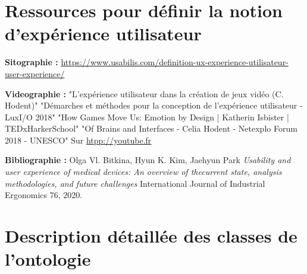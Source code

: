 \documentclass[11pt]{article}
\begin{document}
\newpage
\section{Ressources pour définir la notion d'expérience utilisateur}\label{ann:ux}
	\textbf{Sitographie :}\newline
	\href{https://www.usabilis.com/definition-ux-experience-utilisateur-user-experience/}{https://www.usabilis.com/definition-ux-experience-utilisateur-user-experience/}\par
	\textbf{Videographie :}\newline
	"L'expérience utilisateur dans la création de jeux vidéo (C. Hodent)"\newline
	"Démarches et méthodes pour la conception de l'expérience utilisateur - LuxI/O 2018"\newline
	"How Games Move Us: Emotion by Design | Katherin Isbister | TEDxHarkerSchool"\newline
	"Of Brains and Interfaces - Celia Hodent - Netexplo  Forum 2018 - UNESCO"
	Sur \href{http://youtube.fr}{htpp://youtube.fr}\par
	\textbf{Bibliographie :}\newline
	Olga Vl. Bitkina, Hyun K. Kim, Jaehyun Park \textit{Usability and user experience of medical devices: An overview of thecurrent state, analysis methodologies, and future challenges} International Journal of Industrial Ergonomics 76, 2020.

\newpage
\section{Description détaillée des classes de l'ontologie}\label{ann:detailclasses}
	

\newpage
\end{document}
